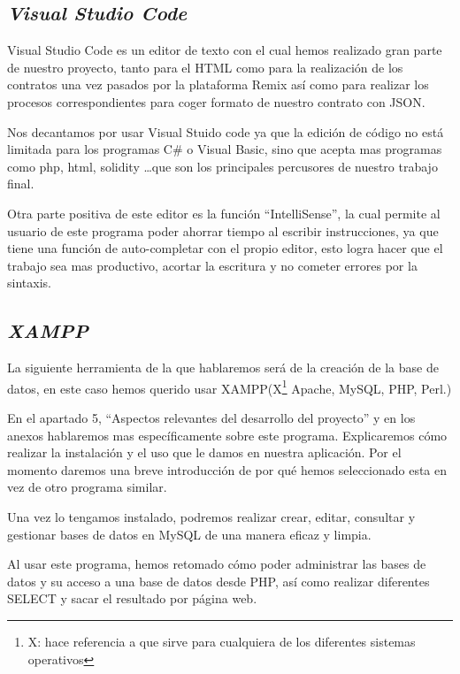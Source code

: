 \subsection{\textit{Visual Studio Code}}

Visual Studio Code\cite{VisualStudio} es un editor de texto con el cual hemos realizado gran parte de nuestro proyecto, tanto para el HTML como para la realización de los contratos una vez pasados por la plataforma Remix así como para realizar los procesos correspondientes para coger formato de nuestro contrato con JSON.

Nos decantamos por usar Visual Stuido\cite{VS-code} code ya que la edición de código no está limitada para los programas C\# o Visual Basic, sino que acepta mas programas como php, html, solidity \ldots que son los principales percusores de nuestro trabajo final. 

Otra parte positiva de este editor es la función ``IntelliSense'', la cual permite al usuario de este programa poder ahorrar tiempo al escribir instrucciones, ya que tiene una función de auto-completar con el propio editor, esto logra hacer que el trabajo sea mas productivo, acortar la escritura y no cometer errores por la sintaxis.

\subsection{\textit{XAMPP}}

La siguiente herramienta de la que hablaremos será de la creación de la base de datos, en este caso hemos querido usar XAMPP\cite{xampp}(X\footnote{X: hace referencia a que sirve para cualquiera de los diferentes sistemas operativos} Apache, MySQL, PHP, Perl.)

En el apartado 5, ``Aspectos relevantes del desarrollo del proyecto'' y en los anexos hablaremos mas específicamente sobre este programa. Explicaremos cómo realizar la instalación y el uso que le damos en nuestra aplicación. Por el momento daremos una breve introducción de por qué hemos seleccionado esta en vez de otro programa similar.

Una vez lo tengamos instalado, podremos realizar crear, editar, consultar y gestionar bases de datos en MySQL de una manera eficaz y limpia.

Al usar este programa, hemos retomado cómo poder administrar las bases de datos y su acceso a una base de datos desde PHP, así como realizar diferentes SELECT y sacar el resultado por página web.


